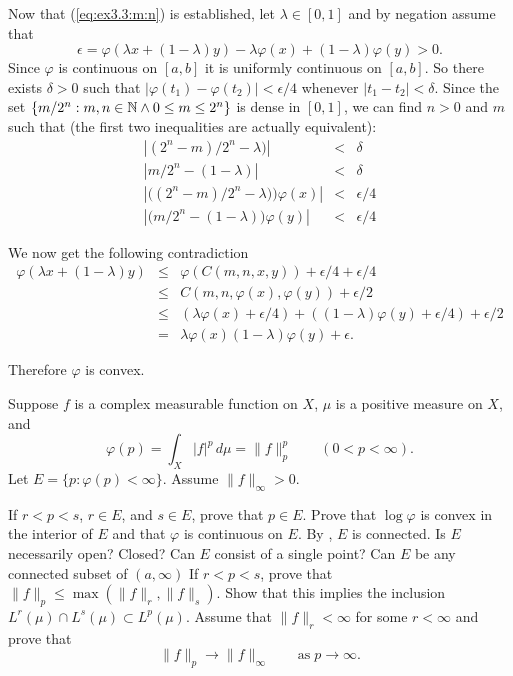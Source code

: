 \begin{enumerate}
Now that (\ref{eq:ex3.3:m:n}) is established, let \(\lambda\in[0,1]\)
and by negation assume that
\begin{equation*}
 \epsilon = \varphi(\lambda x + (1-\lambda)y) -
 \lambda \varphi(x) + (1-\lambda)\varphi(y) > 0.
\end{equation*}
Since \(\varphi\) is continuous on \([a,b]\) it is uniformly continuous
on \([a,b]\). So there exists \(\delta>0\) such that
\(|\varphi(t_1) - \varphi(t_2)| < \epsilon/4\)
whenever \(|t_1-t_2|<\delta\).
Since the set \(\{m/2^n: m,n\in\mathbb{N}\wedge 0\leq m\leq 2^n\}\)
is dense in \([0,1]\), we can find \(n>0\) and $m$ such that
(the first two inequalities are actually equivalent):
\begin{eqnarray*}
|(2^n - m)/2^n - \lambda)| &<& \delta \\
|m/2^n - (1-\lambda)| &<& \delta \\
|\bigl((2^n - m)/2^n - \lambda)\bigr)\varphi(x)| &<& \epsilon/4 \\
|\bigl(m/2^n - (1-\lambda)\bigr)\varphi(y)| &<& \epsilon/4
\end{eqnarray*}

We now get the following contradiction
\begin{eqnarray*}
\varphi(\lambda x + (1-\lambda)y)
&\leq& \varphi(C(m,n,x,y)) + \epsilon/4 + \epsilon/4 \\
&\leq& C(m,n,\varphi(x),\varphi(y)) + \epsilon/2 \\
&\leq& (\lambda\varphi(x) + \epsilon/4) + ((1-\lambda)\varphi(y) + \epsilon/4)
       + \epsilon/2 \\
&=&    \lambda\varphi(x) (1-\lambda)\varphi(y) + \epsilon.
\end{eqnarray*}

Therefore \(\varphi\) is convex.


\begin{excopy}
Suppose $f$ is a complex measurable function on $X$, \(\mu\) is a
positive
measure on $X$, and
\begin{equation*}
 \varphi(p) = \int_X |f|^p\,d\mu = \|f\|_p^p \qquad (0<p<\infty).
\end{equation*}
Let \(E = \{p: \varphi(p)<\infty\}\). Assume \(\|f\|_\infty > 0\).
\begin{itemize}
   If \(r<p<s\), \(r\in E\), and \(s\in E\), prove that \(p\in E\).
   Prove that  \(\log\varphi\) is convex in the interior of $E$ and
   that  \(\varphi\) is continuous on $E$.
   By , $E$ is connected. Is $E$ necessarily open? Closed? Can
   $E$ consist of a single point?
   Can $E$ be any connected subset of \((a,\infty)\)
   If \(r<p<s\), prove that \(\|f\|_p \leq \max( \|f\|_r, \|f\|_s)\).
   Show that this implies the inclusion
   \(L^r(\mu) \cap  L^s(\mu) \subset L^p(\mu)\).
   Assume that \(\|f\|_r < \infty\) for some \(r<\infty\) and prove
   that
   \begin{equation*}
     \|f\|_p \to \|f\|_\infty \qquad \textrm{as}\; p\to\infty.
   \end{equation*}
\end{itemize}
\end{excopy}


\end{enumerate}
